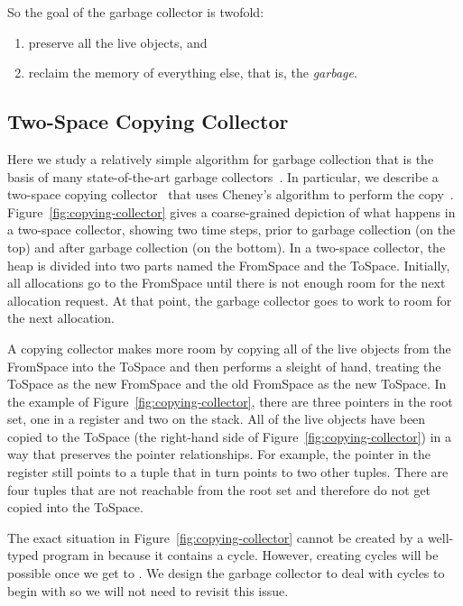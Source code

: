 \documentclass[7x10,nocrop]{TimesAPriori_MIT}%
\begin{document}
So the goal of the garbage collector is twofold:
\begin{enumerate}
\item preserve all the live objects, and
\item reclaim the memory of everything else, that is, the \emph{garbage}.
\end{enumerate}

\subsection{Two-Space Copying Collector}

Here we study a relatively simple algorithm for garbage collection
that is the basis of many state-of-the-art garbage
collectors~\citep{Lieberman:1983aa,Ungar:1984aa,Jones:1996aa,Detlefs:2004aa,Dybvig:2006aa,Tene:2011kx}. In
particular, we describe a two-space copying
collector~\citep{Wilson:1992fk} that uses Cheney's algorithm to
perform the copy~\citep{Cheney:1970aa}.   
Figure~\ref{fig:copying-collector} gives a coarse-grained depiction of
what happens in a two-space collector, showing two time steps, prior
to garbage collection (on the top) and after garbage collection (on
the bottom). In a two-space collector, the heap is divided into two
parts named the FromSpace and the
ToSpace.  Initially, all allocations go to the
FromSpace until there is not enough room for the next allocation
request. At that point, the garbage collector goes to work to room for
the next allocation.

A copying collector makes more room by copying all of the live objects
from the FromSpace into the ToSpace and then performs a sleight of
hand, treating the ToSpace as the new FromSpace and the old FromSpace
as the new ToSpace.  In the example of
Figure~\ref{fig:copying-collector}, there are three pointers in the
root set, one in a register and two on the stack.  All of the live
objects have been copied to the ToSpace (the right-hand side of
Figure~\ref{fig:copying-collector}) in a way that preserves the
pointer relationships. For example, the pointer in the register still
points to a tuple that in turn points to two other tuples.  There are
four tuples that are not reachable from the root set and therefore do
not get copied into the ToSpace.

The exact situation in Figure~\ref{fig:copying-collector} cannot be
created by a well-typed program in \LangVec{} because it contains a
cycle. However, creating cycles will be possible once we get to
\LangDyn{}.  We design the garbage collector to deal with cycles to
begin with so we will not need to revisit this issue.
\end{document}
